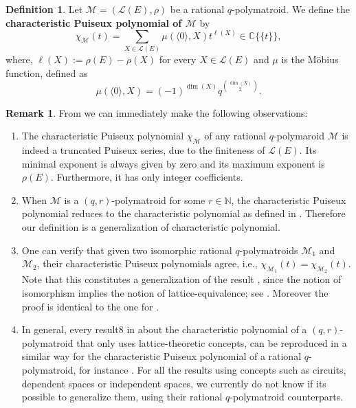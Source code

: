 \documentclass[a4paper,11pt,reqno]{amsart}
\theoremstyle{definition}
\newtheorem{definition}[theorem]{{{Definition}}}
\newtheorem{remark}[theorem]{{{Remark}}}
\newcommand{\mM}{\mathcal{M}}
\newcommand{\mL}{\mathcal{L}}
\begin{document}
{\begin{definition}\label{def: char_Puiseux_series}
    Let $\mM=(\mL(E),\rho)$ be a rational $q$-polymatroid. We define the \textbf{characteristic Puiseux  polynomial of $\mM$} by
    \[
        \chi_\mM(t)=\sum_{X\in\mL(E)}\mu(\langle 0\rangle,X)t^{\ell(X)}\in\mathbb{C}\{\!\{t\}\!\}, 
    \]
    where, $\ell(X):=\rho(E)-\rho(X)$ for every $X\in\mL(E)$ and $\mu$ is the Möbius function, defined as 
    $$ \mu(\langle 0 \rangle, X)=(-1)^{\dim(X)}q^{\dim(X)\choose 2}.$$
\end{definition}


\begin{remark}\label{rem: char_Puiseux_series}
    From  we can immediately make the following observations:
    \begin{enumerate}
        \item[(a)] The characteristic Puiseux  polynomial $\chi_\mM$ of any rational $q$-polymaroid $\mM$ is indeed a truncated Puiseux series, due to the finiteness of $\mL(E)$. Its minimal exponent is always given by zero and its maximum exponent is $\rho(E)$. Furthermore, it has only integer coefficients.
        
        \item[(b)] When $\mM$ is a $(q,r)$-polymatroid for some $r\in\mathbb{N}$, the characteristic Puiseux polynomial reduces to the characteristic polynomial as defined in \cite[Def. 23]{byrne2024weighted}. Therefore our definition is a generalization of characteristic polynomial.
        
        \item[(c)] One can verify that given two isomorphic rational $q$-polymatroids $\mM_1$ and $\mM_2$, their characteristic Puiseux polynomials agree, i.e., $\chi_{\mM_1}(t)=\chi_{\mM_2}(t)$. Note that this constitutes a generalization of the result \cite[Lem. 25]{byrne2024weighted}, since the notion of isomorphism implies the notion of lattice-equivalence; see \cite[Def. 3]{byrne2024weighted}. Moreover the proof is identical to the one for \cite[Lem. 25]{byrne2024weighted}.

        \item[(d)] In general, every result8 in \cite[Sec. 3]{byrne2024weighted} about the characteristic polynomial of a $(q,r)$-polymatroid that only uses lattice-theoretic concepts, can be reproduced in a similar way for the characteristic Puiseux  polynomial of a rational $q$-polymatroid, for instance \cite[Lem. 26]{byrne2024weighted}. For all the results using concepts such as circuits, dependent spaces or independent spaces, we currently do not know if its possible to generalize them, using their rational $q$-polymatroid counterparts.      
    \end{enumerate}
\end{remark}

}
\end{document}
